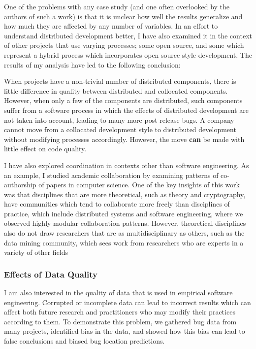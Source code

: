 \documentclass[10pt]{article}
\newcommand\Subsection[1]{\subsubsection*{#1}}
\begin{document}
\begin{small}
One of the problems with any case study (and one often overlooked by the
authors of such a work) is that it is unclear how well the results generalize
and how much they are affected by any number of variables.  In an effort to
understand distributed development better, I have also examined it in the context 
of other projects that use varying processes; some open source, and some which
represent a hybrid process which incorporates open source style development.
The results of my analysis have led to the following conclusion:

When projects have a non-trivial number of distributed components, there is
little difference in quality between distributed and collocated components.
However, when only a few of the components are distributed, such components
suffer from a software process in which the effects of distributed development
are not taken into account, leading to many more post release bugs.  A
company cannot move from a collocated development
style to distributed development without modifying processes accordingly.
However, the move \textbf{can} be made with little effect on code quality.

I have also explored coordination in contexts other than software engineering.
As an example, I studied academic collaboration by examining patterns of
co-authorship of papers in computer science.  One of the key insights of this
work was that disciplines that are more theoretical, such as theory and
cryptography, have communities which tend to collaborate more freely than
disciplines of practice, which include distributed systems and software
engineering, where we observed highly modular collaboration patterns.  However,
theoretical disciplines also do not draw researchers that are as
multidisciplinary as others, such as the data mining community, which sees
work from researchers who are experts in a variety of other fields


\Subsection{Effects of Data Quality}

I am also interested in the quality of data that is used in empirical software
engineering.  Corrupted or incomplete data can lead to incorrect results which
can affect both future research and practitioners who may modify their
practices according to them.  To demonstrate this problem, we gathered bug data
from many projects, identified bias in the data, and showed how this bias can
lead to false conclusions and biased bug location predictions.


\end{small}
\end{document}
